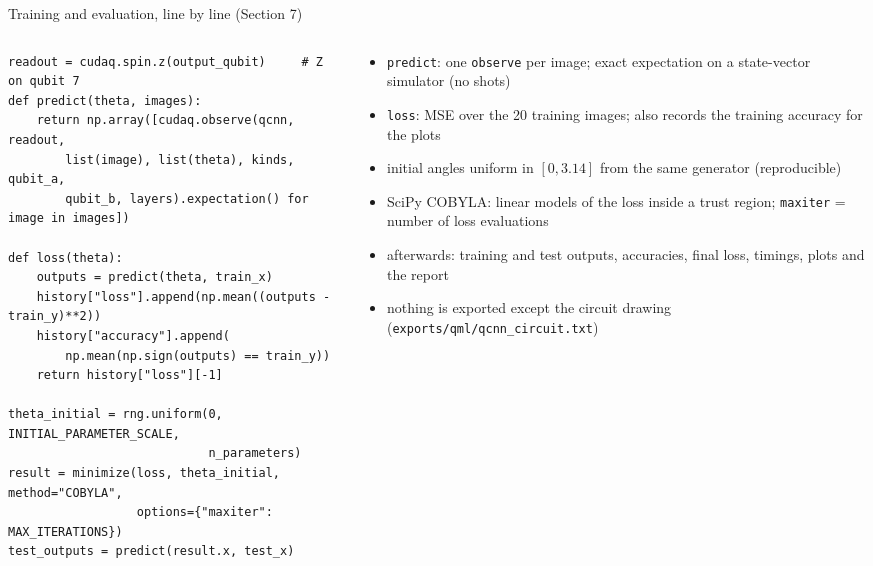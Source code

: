 \documentclass[aspectratio=169,11pt]{beamer}
\begin{document}
\begin{frame}[fragile,label=fTrain]{Training and evaluation, line by line (Section 7)}
  \begin{columns}[T]
    \begin{column}{0.57\textwidth}
\begin{lstlisting}[basicstyle=\ttfamily\tiny]
readout = cudaq.spin.z(output_qubit)     # Z on qubit 7
def predict(theta, images):
    return np.array([cudaq.observe(qcnn, readout,
        list(image), list(theta), kinds, qubit_a,
        qubit_b, layers).expectation() for image in images])

def loss(theta):
    outputs = predict(theta, train_x)
    history["loss"].append(np.mean((outputs - train_y)**2))
    history["accuracy"].append(
        np.mean(np.sign(outputs) == train_y))
    return history["loss"][-1]

theta_initial = rng.uniform(0, INITIAL_PARAMETER_SCALE,
                            n_parameters)
result = minimize(loss, theta_initial, method="COBYLA",
                  options={"maxiter": MAX_ITERATIONS})
test_outputs = predict(result.x, test_x)
\end{lstlisting}
    \end{column}
    \begin{column}{0.40\textwidth}
      \scriptsize
      \begin{itemize}\itemsep1pt
        \item \texttt{predict}: one \texttt{observe} per image; exact expectation on a state-vector simulator (no shots)
        \item \texttt{loss}: MSE over the 20 training images; also records the training accuracy for the plots
        \item initial angles uniform in $[0, 3.14]$ from the same generator (reproducible)
        \item SciPy COBYLA: linear models of the loss inside a trust region; \texttt{maxiter} = number of loss evaluations
        \item afterwards: training and test outputs, accuracies, final loss, timings, plots and the report
        \item nothing is exported except the circuit drawing (\texttt{exports/qml/qcnn\_circuit.txt})
      \end{itemize}
    \end{column}
  \end{columns}
\end{frame}
\end{document}

